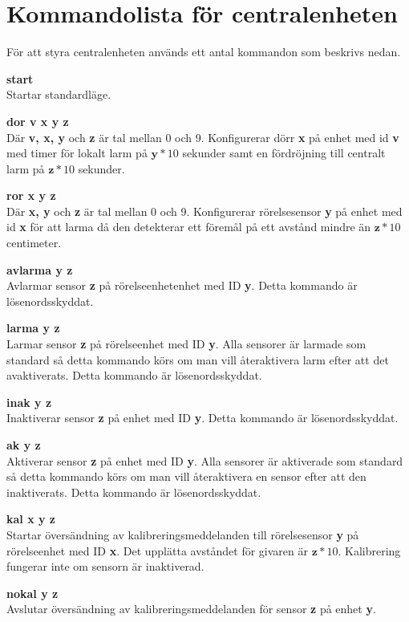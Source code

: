 \documentclass{article}
\begin{document}
    \section{Kommandolista för centralenheten}
    \label{kommandon}
        För att styra centralenheten används ett antal kommandon som beskrivs nedan.

    \textbf{start}\\
    Startar standardläge.

    \textbf{dor v x y z}\\
    Där \textbf{v, x, y} och \textbf{z} är tal mellan 0 och 9. Konfigurerar dörr \textbf{x} på enhet med id \textbf{v} med timer för lokalt larm på  \(\textbf{y} * 10\) sekunder samt en fördröjning till centralt larm på \(\textbf{z} * 10\) sekunder.

    \textbf{ror x y z}\\
    Där \textbf{x, y} och \textbf{z} är tal mellan 0 och 9. Konfigurerar rörelsesensor \textbf{y} på enhet med id \textbf{x} för att larma då den detekterar ett föremål på ett avstånd mindre än \(\textbf{z} * 10\) centimeter.

    \textbf{avlarma y z} \\
    Avlarmar sensor \textbf{z} på rörelseenhetenhet med ID \textbf{y}. Detta kommando är lösenordsskyddat.

    \textbf{larma y z} \\
    Larmar sensor \textbf{z} på rörelseenhet med ID \textbf{y}. Alla sensorer är larmade som standard så detta kommando körs om man vill återaktivera larm efter att det avaktiverats. Detta kommando är lösenordsskyddat.

    \textbf{inak y z} \\
    Inaktiverar sensor \textbf{z} på enhet med ID \textbf{y}. Detta kommando är lösenordsskyddat.

    \textbf{ak y z} \\
    Aktiverar sensor \textbf{z} på enhet med ID \textbf{y}. Alla sensorer är aktiverade som standard så detta kommando körs om man vill återaktivera en sensor efter att den inaktiverats. Detta kommando är lösenordsskyddat.

    \textbf{kal x y z} \\
    Startar översändning av kalibreringsmeddelanden till rörelsesensor \textbf{y} på rörelseenhet med ID \textbf{x}. Det upplätta avståndet för givaren är \(\textbf{z} * 10\). Kalibrering fungerar inte om sensorn är inaktiverad.

    \textbf{nokal y z} \\
    Avslutar översändning av kalibreringsmeddelanden för sensor \textbf{z} på enhet \textbf{y}.
\end{document}
